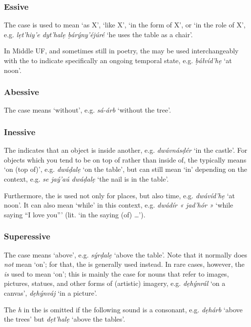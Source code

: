 \documentclass[a4paper, 12pt, twoside, final]{article}
\let \w \textit
\begin{document}
\subsubsection{Essive}
The  case is used to mean ‘as X’, ‘like X’, ‘in the form of X’, or ‘in the role of X’, e.g. \w{lẹt’hiy’e dyt’halẹ ḅárýny’éjúré}
‘he uses the table as a chair’.

In Middle UF, and sometimes still in poetry, the  may be used interchangeably with the  to indicate
specifically an ongoing temporal state, e.g. \w{ḅáłvíd’hẹ} ‘at noon’.

\subsubsection{Abessive}
The  case means ‘without’, e.g. \w{sá-árb} ‘without the tree’.

\subsubsection{Inessive}
The  indicates that an object is inside another, e.g. \w{dwávnásḍér} ‘in the castle’. For objects which you tend
to be on top of rather than inside of, the  typically means ‘on (top of)’, e.g. \w{dwáḍalẹ} ‘on the table’, but
can still mean ‘in’ depending on the context, e.g. \w{se jaý’aú dwáḍalẹ} ‘the nail is in the table’.

Furthermore, the  is used not only for places, but also time, e.g. \w{dwávíd’hẹ} ‘at noon’. It can also mean
‘while’ in this context, e.g. \w{dwádír « jad’hór »} ‘while saying “I love you”’ (lit. ‘in the saying (of) \ldots’).

\subsubsection{Superessive}
The  case means ‘above’, e.g. \w{sýrḍalẹ} ‘above the table’. Note that it normally does \textit{not} mean
‘on’; for that, the  is generally used instead. In rare cases, however, the  \textit{is} used to mean
‘on’; this is mainly the case for nouns that refer to images, pictures, statues, and other forms of (artistic) imagery,
e.g. \w{dẹhýnrál} ‘on a canvas’, \w{dẹhýnváj} ‘in a picture’.

The \w{h} in the  is omitted if the following sound is a consonant, e.g. \w{dẹhárb} ‘above the trees’
but \w{dẹt’halẹ} ‘above the tables’.
\end{document}
